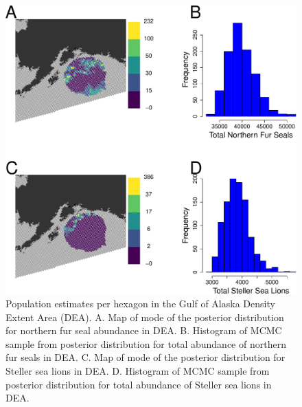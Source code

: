 \documentclass[11pt, titlepage]{article}
\begin{document}
\begin{spacing}{1.9}
\begin{flushleft}
\begin{figure}[H]
  \begin{center}
  \includegraphics[width=.9\linewidth]{figures/Fig-GOAabu}
  \end{center}
  \caption{Population estimates per hexagon in the Gulf of Alaska Density Extent Area (DEA). A. Map of mode of the posterior distribution for northern fur seal abundance in DEA. B. Histogram of MCMC sample from posterior distribution for total abundance of northern fur seals in DEA. C. Map of mode of the posterior distribution for Steller sea lions in DEA. D. Histogram of MCMC sample from posterior distribution for total abundance of Steller sea lions in DEA. \label{Fig-GOAabu}}         
\end{figure} 


\end{flushleft}
\end{spacing}
\end{document}

